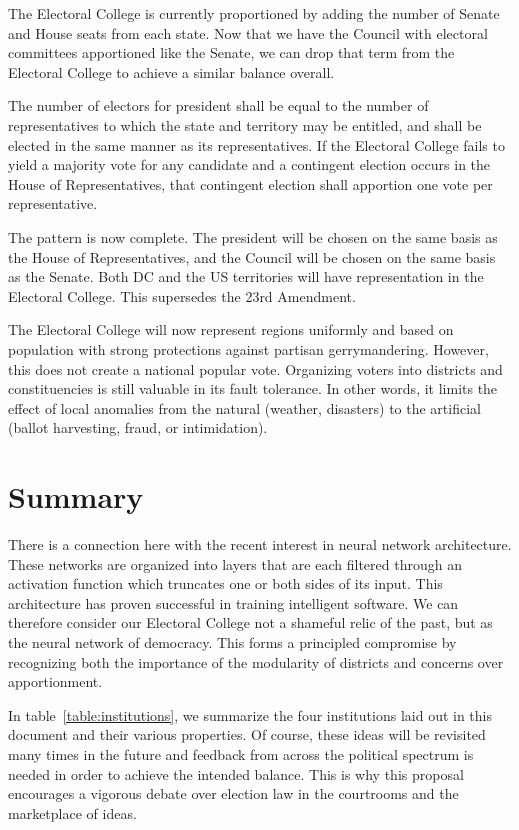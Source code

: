 \documentclass{article}
\begin{document}
The Electoral College is currently proportioned by adding the number of Senate and House seats from each state. Now that we have the Council with electoral committees apportioned like the Senate, we can drop that term from the Electoral College to achieve a similar balance overall.

\begin{quoting}
The number of electors for president shall be equal to the number of representatives to which the state and territory may be entitled, and shall be elected in the same manner as its representatives. If the Electoral College fails to yield a majority vote for any candidate and a contingent election occurs in the House of Representatives, that contingent election shall apportion one vote per representative.
\end{quoting}

The pattern is now complete. The president will be chosen on the same basis as the House of Representatives, and the Council will be chosen on the same basis as the Senate. Both DC and the US territories will have representation in the Electoral College. This supersedes the 23rd Amendment.

The Electoral College will now represent regions uniformly and based on population with strong protections against partisan gerrymandering. However, this does not create a national popular vote. Organizing voters into districts and constituencies is still valuable in its fault tolerance. In other words, it limits the effect of local anomalies from the natural (weather, disasters) to the artificial (ballot harvesting, fraud, or intimidation).

\section{Summary}

There is a connection here with the recent interest in neural network architecture. These networks are organized into layers that are each filtered through an activation function which truncates one or both sides of its input. This architecture has proven successful in training intelligent software. We can therefore consider our Electoral College not a shameful relic of the past, but as the neural network of democracy. This forms a principled compromise by recognizing both the importance of the modularity of districts and concerns over apportionment.

In table~\ref{table:institutions}, we summarize the four institutions laid out in this document and their various properties. Of course, these ideas will be revisited many times in the future and feedback from across the political spectrum is needed in order to achieve the intended balance. This is why this proposal encourages a vigorous debate over election law in the courtrooms and the marketplace of ideas.
\end{document}
